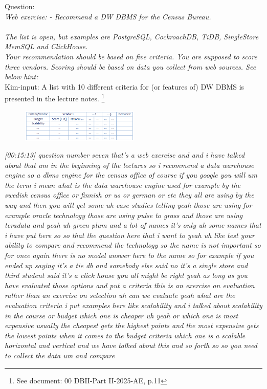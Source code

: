 Question:\\
\emph{
    Web exercise:
- Recommend a DW DBMS for the Census Bureau.\\\\ The list is open, but examples
are PostgreSQL, CockroachDB, TiDB, SingleStore MemSQL and ClickHouse.\\ Your
recommendation should be based on five criteria. You are supposed to score
three vendors. Scoring should be based on data you collect from web sources.
See below hint:}\\

Kim-input: A list with 10 different criteria for (or features of) DW DBMS is presented in 
the lecture notes. \footnote{See document: 00 DBII-Part II-2025-AE, p.11} 

\begin{figure}[h] %
    \centering
    \includegraphics[width=0.5\textwidth]{Figures/Q7_QUESTION_table.PNG}
    \label{fig:my_image}
\end{figure}

\emph{[00:15:13] question number seven that's a web exercise and and i have talked about that
um in the beginning of the lectures so i recommend a data warehouse engine so a dbms engine for the
census office of course if you google you will um the term i mean what is the data warehouse engine used
for example by the swedish census office or finnish or us or german or etc they all are using by the way
and then you will get some uh case studies telling yeah those are using for example oracle technology
those are using pulse to grass and those are using teradata and yeah uh green plum and a lot of names
it's only uh some names that i have put here so so that the question here that i want to
yeah uh like test your ability to compare and recommend the technology so the name is not important so for
once again there is no model answer here to the name so for example if you ended up saying it's a tie db
and somebody else said no it's a single store and third student said it's a click house you all might
be right yeah as long as you have evaluated those options and put a criteria this is an exercise on
evaluation rather than an exercise on selection uh can we evaluate yeah what are the evaluation criteria
i put examples here like scalability and i talked about scalability in the course
or budget which one is cheaper uh yeah or which one is most expensive usually the cheapest gets the
highest points and the most expensive gets the lowest points when it comes to the budget criteria
which one is a scalable horizontal and vertical and we have talked about this and so forth so so you need
to collect the data um and compare}\\

